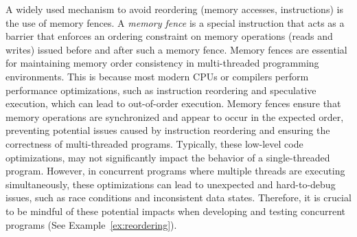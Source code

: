 A widely used mechanism to avoid reordering (memory accesses, instructions) is the use of memory fences. A \emph{memory fence} is a special instruction that acts as a barrier that enforces an ordering constraint on memory operations (reads and writes) issued before and after such a memory fence. Memory fences are essential for maintaining memory order consistency in multi-threaded programming environments. This is because most modern CPUs or compilers perform performance optimizations, such as instruction reordering and speculative execution, which can lead to out-of-order execution. Memory fences ensure that memory operations are synchronized and appear to occur in the expected order, preventing potential issues caused by instruction reordering and ensuring the correctness of multi-threaded programs. Typically, these low-level code optimizations, may not significantly impact the behavior of a single-threaded program. However, in concurrent programs where multiple threads are executing simultaneously, these optimizations can lead to unexpected and hard-to-debug issues, such as race conditions and inconsistent data states. Therefore, it is crucial to be mindful of these potential impacts when developing and testing concurrent programs (See Example~\ref{ex:reordering}).

